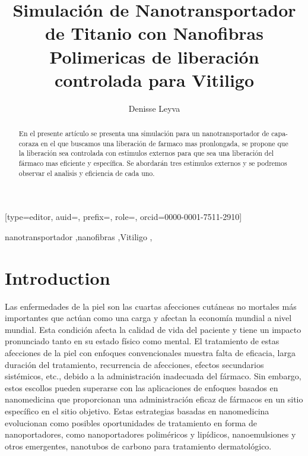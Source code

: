 \documentclass[a4paper,fleqn]{cas-sc}
\begin{document}
\title [mode = title]{Simulación de Nanotransportador de Titanio con Nanofibras Polimericas de liberación controlada para Vitiligo}                      




\author[1,3]{Denisse Leyva}[type=editor,
                        auid=,
                        prefix=,
                        role=,
                        orcid=0000-0001-7511-2910]
\cormark[1]
\fnmark[1]


\address[1]{Facultad de Ingenieria Mecánica y Eléctrica}



\begin{abstract}
En el presente artículo se presenta una simulación para un nanotransportador de capa-coraza en el que buscamos una liberación de farmaco mas pronlongada, se propone que la liberación sea controlada con estimulos externos para que sea una liberación del fármaco mas eficiente y específica. Se abordarán tres estimulos externos y se podremos observar el analisis y eficiencia de cada uno.
\end{abstract}


\begin{keywords}
nanotransportador \sep nanofibras \sep Vitiligo \sep \BEC
\end{keywords}


\maketitle


\section{Introduction}
Las enfermedades de la piel son las cuartas afecciones cutáneas no mortales más importantes que actúan como una carga y afectan la economía mundial a nivel mundial. Esta condición afecta la calidad de vida del paciente y tiene un impacto pronunciado tanto en su estado físico como mental. El tratamiento de estas afecciones de la piel con enfoques convencionales muestra falta de eficacia, larga duración del tratamiento, recurrencia de afecciones, efectos secundarios sistémicos, etc., debido a la administración inadecuada del fármaco. Sin embargo, estos escollos pueden superarse con las aplicaciones de enfoques basados en nanomedicina que proporcionan una administración eficaz de fármacos en un sitio específico en el sitio objetivo. Estas estrategias basadas en nanomedicina evolucionan como posibles oportunidades de tratamiento en forma de nanoportadores, como nanoportadores poliméricos y lipídicos, nanoemulsiones y otros emergentes, nanotubos de carbono para tratamiento dermatológico. 
\end{document}
